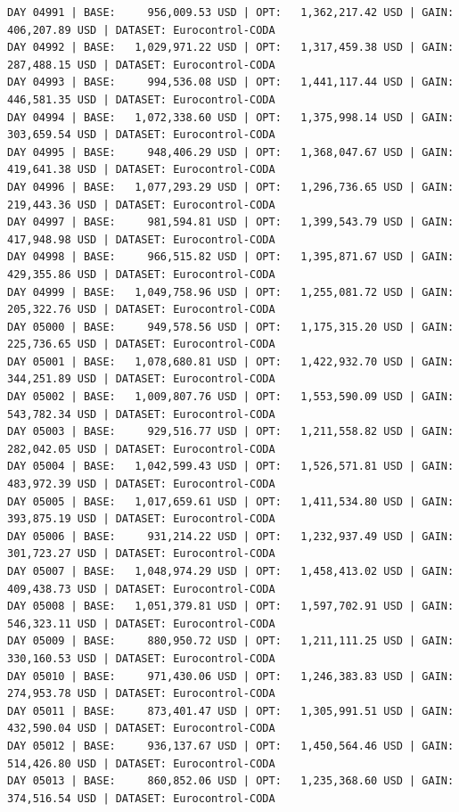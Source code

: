 \documentclass[11pt,a4paper]{article}
\begin{document}
\begin{verbatim}
DAY 04991 | BASE:     956,009.53 USD | OPT:   1,362,217.42 USD | GAIN: 406,207.89 USD | DATASET: Eurocontrol-CODA
DAY 04992 | BASE:   1,029,971.22 USD | OPT:   1,317,459.38 USD | GAIN: 287,488.15 USD | DATASET: Eurocontrol-CODA
DAY 04993 | BASE:     994,536.08 USD | OPT:   1,441,117.44 USD | GAIN: 446,581.35 USD | DATASET: Eurocontrol-CODA
DAY 04994 | BASE:   1,072,338.60 USD | OPT:   1,375,998.14 USD | GAIN: 303,659.54 USD | DATASET: Eurocontrol-CODA
DAY 04995 | BASE:     948,406.29 USD | OPT:   1,368,047.67 USD | GAIN: 419,641.38 USD | DATASET: Eurocontrol-CODA
DAY 04996 | BASE:   1,077,293.29 USD | OPT:   1,296,736.65 USD | GAIN: 219,443.36 USD | DATASET: Eurocontrol-CODA
DAY 04997 | BASE:     981,594.81 USD | OPT:   1,399,543.79 USD | GAIN: 417,948.98 USD | DATASET: Eurocontrol-CODA
DAY 04998 | BASE:     966,515.82 USD | OPT:   1,395,871.67 USD | GAIN: 429,355.86 USD | DATASET: Eurocontrol-CODA
DAY 04999 | BASE:   1,049,758.96 USD | OPT:   1,255,081.72 USD | GAIN: 205,322.76 USD | DATASET: Eurocontrol-CODA
DAY 05000 | BASE:     949,578.56 USD | OPT:   1,175,315.20 USD | GAIN: 225,736.65 USD | DATASET: Eurocontrol-CODA
DAY 05001 | BASE:   1,078,680.81 USD | OPT:   1,422,932.70 USD | GAIN: 344,251.89 USD | DATASET: Eurocontrol-CODA
DAY 05002 | BASE:   1,009,807.76 USD | OPT:   1,553,590.09 USD | GAIN: 543,782.34 USD | DATASET: Eurocontrol-CODA
DAY 05003 | BASE:     929,516.77 USD | OPT:   1,211,558.82 USD | GAIN: 282,042.05 USD | DATASET: Eurocontrol-CODA
DAY 05004 | BASE:   1,042,599.43 USD | OPT:   1,526,571.81 USD | GAIN: 483,972.39 USD | DATASET: Eurocontrol-CODA
DAY 05005 | BASE:   1,017,659.61 USD | OPT:   1,411,534.80 USD | GAIN: 393,875.19 USD | DATASET: Eurocontrol-CODA
DAY 05006 | BASE:     931,214.22 USD | OPT:   1,232,937.49 USD | GAIN: 301,723.27 USD | DATASET: Eurocontrol-CODA
DAY 05007 | BASE:   1,048,974.29 USD | OPT:   1,458,413.02 USD | GAIN: 409,438.73 USD | DATASET: Eurocontrol-CODA
DAY 05008 | BASE:   1,051,379.81 USD | OPT:   1,597,702.91 USD | GAIN: 546,323.11 USD | DATASET: Eurocontrol-CODA
DAY 05009 | BASE:     880,950.72 USD | OPT:   1,211,111.25 USD | GAIN: 330,160.53 USD | DATASET: Eurocontrol-CODA
DAY 05010 | BASE:     971,430.06 USD | OPT:   1,246,383.83 USD | GAIN: 274,953.78 USD | DATASET: Eurocontrol-CODA
DAY 05011 | BASE:     873,401.47 USD | OPT:   1,305,991.51 USD | GAIN: 432,590.04 USD | DATASET: Eurocontrol-CODA
DAY 05012 | BASE:     936,137.67 USD | OPT:   1,450,564.46 USD | GAIN: 514,426.80 USD | DATASET: Eurocontrol-CODA
DAY 05013 | BASE:     860,852.06 USD | OPT:   1,235,368.60 USD | GAIN: 374,516.54 USD | DATASET: Eurocontrol-CODA

\end{verbatim}
\end{document}
